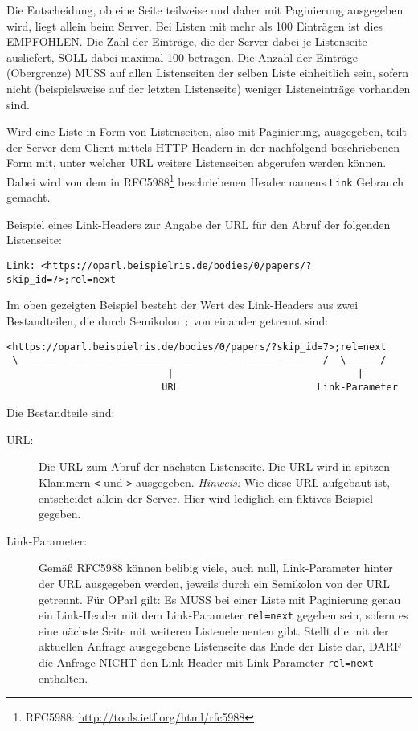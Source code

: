 \documentclass[,a4paper]{article}
\begin{document}
Die Entscheidung, ob eine Seite teilweise und daher mit Paginierung
ausgegeben wird, liegt allein beim Server. Bei Listen mit mehr als 100
Einträgen ist dies EMPFOHLEN. Die Zahl der Einträge, die der Server
dabei je Listenseite ausliefert, SOLL dabei maximal 100 betragen. Die
Anzahl der Einträge (Obergrenze) MUSS auf allen Listenseiten der selben
Liste einheitlich sein, sofern nicht (beispielsweise auf der letzten
Listenseite) weniger Listeneinträge vorhanden sind.

Wird eine Liste in Form von Listenseiten, also mit Paginierung,
ausgegeben, teilt der Server dem Client mittels HTTP-Headern in der
nachfolgend beschriebenen Form mit, unter welcher URL weitere
Listenseiten abgerufen werden können. Dabei wird von dem in
RFC5988\footnote{RFC5988: \url{http://tools.ietf.org/html/rfc5988}}
beschriebenen Header namens \texttt{Link} Gebrauch gemacht.

Beispiel eines Link-Headers zur Angabe der URL für den Abruf der
folgenden Listenseite:

\begin{verbatim}
Link: <https://oparl.beispielris.de/bodies/0/papers/?skip_id=7>;rel=next
\end{verbatim}

Im oben gezeigten Beispiel besteht der Wert des Link-Headers aus zwei
Bestandteilen, die durch Semikolon \texttt{;} von einander getrennt
sind:

\begin{verbatim}
<https://oparl.beispielris.de/bodies/0/papers/?skip_id=7>;rel=next
 \_____________________________________________________/  \______/
                            |                                |
                           URL                        Link-Parameter
\end{verbatim}

Die Bestandteile sind:

\begin{description}
\item[URL:]
Die URL zum Abruf der nächsten Listenseite. Die URL wird in spitzen
Klammern \texttt{\textless{}} und \texttt{\textgreater{}} ausgegeben.
\emph{Hinweis:} Wie diese URL aufgebaut ist, entscheidet allein der
Server. Hier wird lediglich ein fiktives Beispiel gegeben.
\item[Link-Parameter:]
Gemäß RFC5988 können belibig viele, auch null, Link-Parameter hinter der
URL ausgegeben werden, jeweils durch ein Semikolon von der URL getrennt.
Für OParl gilt: Es MUSS bei einer Liste mit Paginierung genau ein
Link-Header mit dem Link-Parameter \texttt{rel=next} gegeben sein,
sofern es eine nächste Seite mit weiteren Listenelementen gibt. Stellt
die mit der aktuellen Anfrage ausgegebene Listenseite das Ende der Liste
dar, DARF die Anfrage NICHT den Link-Header mit Link-Parameter
\texttt{rel=next} enthalten.
\end{description}
\end{document}
